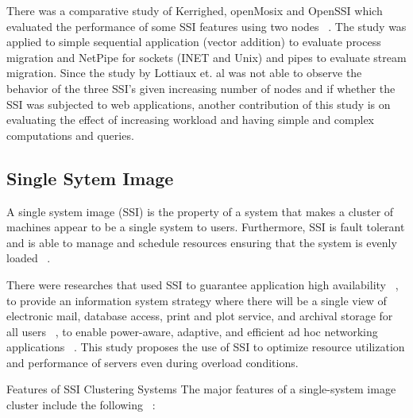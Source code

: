 \documentclass[preprint]{acm_proc_article-sp}
\begin{document}
There was a comparative study of Kerrighed, openMosix and OpenSSI which evaluated the performance of some SSI features using two nodes ~\citep{lottiaux04}. The study was applied to simple sequential application (vector addition) to evaluate process migration and NetPipe for sockets (INET and Unix) and pipes to evaluate stream migration. Since the study by Lottiaux et. al was not able to observe the behavior of the three SSI's given increasing number of nodes and if whether the SSI was subjected to web applications, another contribution of this study is on evaluating the effect of increasing workload and having simple and complex computations and queries.

\subsection{Single Sytem Image}
A single system image (SSI) is the property of a system that makes a cluster of machines appear to be a single system to users. Furthermore, SSI is fault tolerant and is able to manage and schedule resources ensuring that the system is evenly loaded ~\citep{buyya01}.

There were researches that used SSI to guarantee application high availability ~\citep{vallee10}, to provide an information system strategy where there will be a single view of electronic mail, database access, print and plot service, and archival storage for all users ~\citep{heterick88}, to enable power-aware, adaptive, and efficient ad hoc networking applications ~\citep{rimon01}. This study proposes the use of SSI to optimize resource utilization and performance of servers even during overload conditions.

Features of SSI Clustering Systems
The major features of a single-system image cluster include the following ~\citep{buyya01}:
\end{document}
